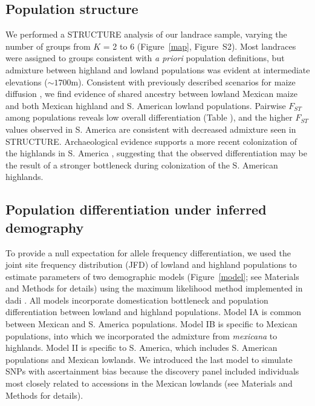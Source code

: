 \subsection*{Population structure}

We performed a {\sf STRUCTURE} analysis \cite[]{Pritchard_2000_10835412,Falush_2003_12930761} of our landrace sample, varying the number of groups from $K$ = 2 to 6 (Figure~\ref{map}, Figure~S2). 
Most landraces were assigned to groups consistent with \emph{a priori} population definitions, but admixture between highland and lowland populations was evident at intermediate elevations ($\sim1700$m).  Consistent with previously described scenarios for maize diffusion \cite[]{Piperno_2006_69}, we find evidence of shared ancestry between lowland Mexican maize and both Mexican highland and S. American lowland populations.  Pairwise $F_{ST}$ among populations reveals low overall differentiation (Table \label{FstP}), and the higher $F_{ST}$ values observed in S. America are consistent with decreased admixture seen in STRUCTURE.  Archaeological evidence supports a more recent colonization of the highlands in S. America  \cite[]{Piperno_2006_69,Perry_2006_16511492,Grobman_2012_22307642}, suggesting that the observed differentiation may be the result of a stronger bottleneck during colonization of the S. American highlands. 

\subsection*{Population differentiation under inferred demography}

To provide a null expectation for allele frequency differentiation, we used the joint site frequency distribution (JFD) of lowland and highland populations to estimate parameters of two demographic models (Figure~\ref{model}; see Materials and Methods for details) using the maximum likelihood method implemented in {\sf dadi} \citep{Gutenkunst_2009_19851460}.  
All models incorporate domestication bottleneck \cite[]{Wright_2005_15919994} and population differentiation between lowland and highland populations.
Model IA is common between Mexican and S. America populations.
Model IB is specific to Mexican populations, into which we incorporated the admixture from \emph{mexicana} to highlands.
Model II is specific to S. America, which includes S. American populations and Mexican lowlands.  
We introduced the last model to simulate SNPs with ascertainment bias because the discovery panel included individuals most closely related to accessions in the Mexican lowlands (see Materials and Methods for details).

